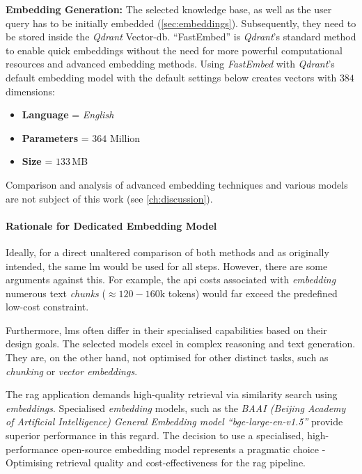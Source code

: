 %
\noindent\textbf{Embedding Generation:}\newline
    The selected knowledge base, as well as the user query has to be initially embedded (\cref{sec:embeddings}).
    Subsequently, they need to be stored inside the \textit{Qdrant} Vector-\ac{db}.
    \enquote{FastEmbed} is \textit{Qdrant}'s standard method to enable quick embeddings without the need for more powerful computational resources and advanced embedding methods.
    Using \textit{FastEmbed} with \textit{Qdrant}'s default embedding model with the default settings below creates vectors with $384$ dimensions:
    \begin{itemize}
        \item \textbf{Language} = \textit{English}
        \item \textbf{Parameters} = $364$ Million
        \item \textbf{Size} = $133$\,MB
    \end{itemize}
    Comparison and analysis of advanced embedding techniques and various models are not subject of this work (see \cref{ch:discussion}).
    
%
    \paragraph{Rationale for Dedicated Embedding Model}\label{par:embedding_rationale}
    Ideally, for a direct unaltered comparison of both methods and as originally intended, the same \ac{lm} would be used for all steps.
    However, there are some arguments against this.
    For example, the \ac{api} costs associated with \textit{embedding} numerous text \textit{chunks} ($\approx 120-160$k tokens) would far exceed the predefined low-cost constraint.
    
    Furthermore, \acp{lm} often differ in their specialised capabilities based on their design goals.
    The selected models excel in complex reasoning and text generation.
    They are, on the other hand, not optimised for other distinct tasks, such as \textit{chunking} or \textit{vector embeddings}. 
    
    The \ac{rag} application demands high-quality retrieval via similarity search using \textit{embeddings}.
    Specialised \textit{embedding} models, such as the \textit{BAAI (Beijing Academy of Artificial Intelligence) General Embedding model \enquote{bge-large-en-v1.5}} provide superior performance in this regard. 
    The decision to use a specialised, high-performance open-source embedding model represents a pragmatic choice - Optimising retrieval quality and cost-effectiveness for the \ac{rag} pipeline.


